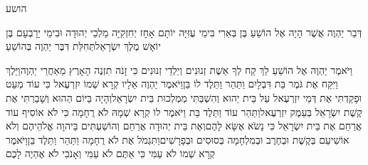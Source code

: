 \documentclass[../main/main.tex]{subfiles}
\begin{document}
\Incipit{}הושע\par
\vspace{\afterchapskip}
\RTLmulticolcolumns
\begin{multicols}{\ncols}
דְּבַר יַהְוֶה אֲשֶׁר הָיָה אֶל הוֹשֵׁעַ בֶּן בְּאֵרִי בִּימֵי עֻזִּיָּה יוֹתָם אָחָז יְחִזְקִיָּה מַלְכֵי יְהוּדָה וּבִימֵי יָרָבְעָם בֶּן יוֹאָשׁ מֶלֶךְ יִשְׂרָאֵל\PreVerseSpace{}תְּחִלַּת דִּבֶּר יַהְוֶה בְּהוֹשֵׁעַ\OpenSection{}\par
וַיֹּאמֶר יַהְוֶה אֶל הוֹשֵׁעַ לֵךְ קַח לְךָ אֵשֶׁת זְנוּנִים וְיַלְדֵי זְנוּנִים כִּי זָנֹה תִזְנֶה הָאָרֶץ מֵאַחֲרֵי יַהְוֶה\PreVerseSpace{}וַיֵּלֶךְ וַיִּקַּח אֶת גֹּמֶר בַּת דִּבְלָיִם וַתַּהַר וַתֵּלֶד לוֹ בֵּן\PreVerseSpace{}וַיֹּאמֶר יַהְוֶה אֵלָיו קְרָא שְׁמוֹ יִזְרְעֶאל כִּי עוֹד מְעַט וּפָקַדְתִּי אֶת דְּמֵי יִזְרְעֶאל עַל בֵּית יֵהוּא וְהִשְׁבַּתִּי מַמְלְכוּת בֵּית יִשְׂרָאֵל\PreVerseSpace{}וְהָיָה בַּיּוֹם הַהוּא וְשָׁבַרְתִּי אֶת קֶשֶׁת יִשְׂרָאֵל בְּעֵמֶק יִזְרְעֶאל\PreVerseSpace{}וַתַּהַר עוֹד וַתֵּלֶד בַּת וַיֹּאמֶר לוֹ קְרָא שְׁמָהּ לֹא רֻחָמָה כִּי לֹא אוֹסִיף עוֹד אֲרַחֵם אֶת בֵּית יִשְׂרָאֵל כִּי נָשֹׂא אֶשָּׂא לָהֶם\PreVerseSpace{}וְאֶת בֵּית יְהוּדָה אֲרַחֵם וְהוֹשַׁעְתִּים בַּיהוָה אֱלֹהֵיהֶם וְלֹא אוֹשִׁיעֵם בְּקֶשֶׁת וּבְחֶרֶב וּבְמִלְחָמָה בְּסוּסִים וּבְפָרָשִׁים\PreVerseSpace{}וַתִּגְמֹל אֶת לֹא רֻחָמָה וַתַּהַר וַתֵּלֶד בֵּן\PreVerseSpace{}וַיֹּאמֶר קְרָא שְׁמוֹ לֹא עַמִּי כִּי אַתֶּם לֹא עַמִּי וְאָנֹכִי לֹא אֶהְיֶה לָכֶם\OpenSection{}\par

\end{multicols}
\end{document}
